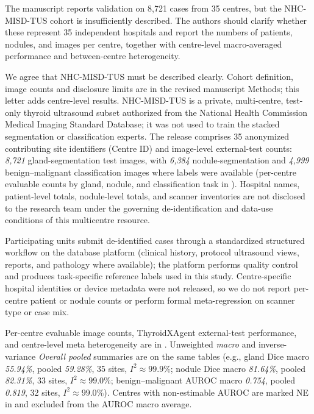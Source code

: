 \label{rev:R2.6}
\begin{reviewercomment}
The manuscript reports validation on 8,721 cases from 35 centres, but the NHC-MISD-TUS cohort is insufficiently described. The authors should clarify whether these represent 35 independent hospitals and report the numbers of patients, nodules, and images per centre, together with centre-level macro-averaged performance and between-centre heterogeneity.
\end{reviewercomment}
\begin{authorresponse}
We agree that NHC-MISD-TUS must be described clearly. Cohort definition, image counts and disclosure limits are in the revised manuscript Methods; this letter adds centre-level results. NHC-MISD-TUS is a private, multi-centre, test-only thyroid ultrasound subset authorized from the National Health Commission Medical Imaging Standard Database; it was not used to train the stacked segmentation or classification experts. The release comprises 35 anonymized contributing site identifiers (Centre ID) and image-level external-test counts: \emph{8{,}721} gland-segmentation test images, with \emph{6{,}384} nodule-segmentation and \emph{4{,}999} benign--malignant classification images where labels were available (per-centre evaluable counts by gland, nodule, and classification task in ). Hospital names, patient-level totals, nodule-level totals, and scanner inventories are not disclosed to the research team under the governing de-identification and data-use conditions of this multicentre resource.\par
Participating units submit de-identified cases through a standardized structured workflow on the database platform (clinical history, protocol ultrasound views, reports, and pathology where available); the platform performs quality control and produces task-specific reference labels used in this study. Centre-specific hospital identities or device metadata were not released, so we do not report per-centre patient or nodule counts or perform formal meta-regression on scanner type or case mix.\par
Per-centre evaluable image counts, ThyroidXAgent external-test performance, and centre-level meta heterogeneity are in . Unweighted \emph{macro} and inverse-variance \emph{Overall pooled} summaries are on the same tables (e.g., gland Dice macro \emph{55.94\%}, pooled \emph{59.28\%}, 35 sites, $I^2{\approx}99.9\%$; nodule Dice macro \emph{81.64\%}, pooled \emph{82.31\%}, 33 sites, $I^2{\approx}99.0\%$; benign--malignant AUROC macro \emph{0.754}, pooled \emph{0.819}, 32 sites, $I^2{\approx}99.0\%$). Centres with non-estimable AUROC are marked NE in  and excluded from the AUROC macro average.\par
\par
\end{authorresponse}

